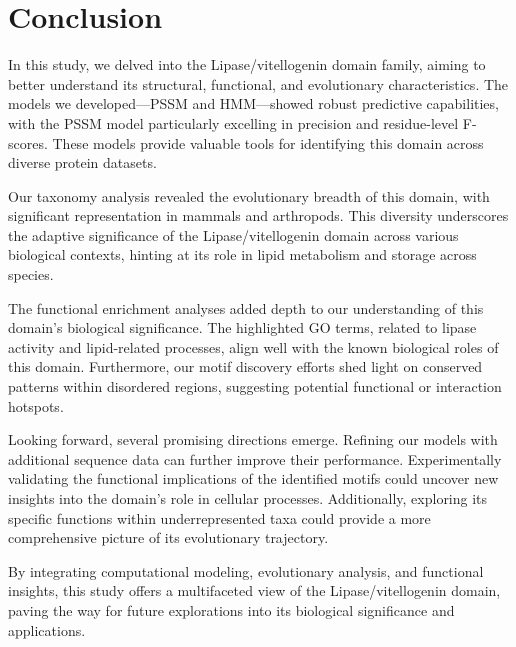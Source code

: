 
\section{Conclusion}
In this study, we delved into the Lipase/vitellogenin domain family, aiming to better understand its structural, functional, and evolutionary characteristics. The models we developed—PSSM and HMM—showed robust predictive capabilities, with the PSSM model particularly excelling in precision and residue-level F-scores. These models provide valuable tools for identifying this domain across diverse protein datasets.

Our taxonomy analysis revealed the evolutionary breadth of this domain, with significant representation in mammals and arthropods. This diversity underscores the adaptive significance of the Lipase/vitellogenin domain across various biological contexts, hinting at its role in lipid metabolism and storage across species.

The functional enrichment analyses added depth to our understanding of this domain's biological significance. The highlighted GO terms, related to lipase activity and lipid-related processes, align well with the known biological roles of this domain. Furthermore, our motif discovery efforts shed light on conserved patterns within disordered regions, suggesting potential functional or interaction hotspots.

Looking forward, several promising directions emerge. Refining our models with additional sequence data can further improve their performance. Experimentally validating the functional implications of the identified motifs could uncover new insights into the domain's role in cellular processes. Additionally, exploring its specific functions within underrepresented taxa could provide a more comprehensive picture of its evolutionary trajectory.

By integrating computational modeling, evolutionary analysis, and functional insights, this study offers a multifaceted view of the Lipase/vitellogenin domain, paving the way for future explorations into its biological significance and applications.
